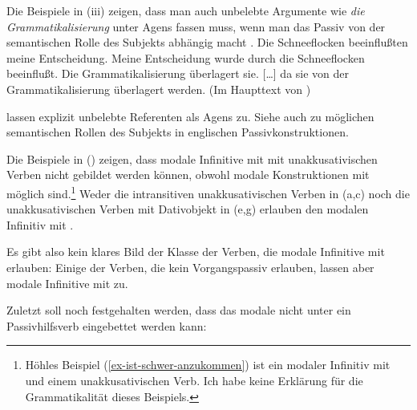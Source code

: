 {        Die Beispiele in (iii) zeigen, dass man auch unbelebte 
        Argumente wie \emph{die Grammatikalisierung} unter Agens fassen muss, wenn
        man das Passiv von der semantischen Rolle des Subjekts abhängig macht \citep[Kapitel~3.1.2]{Mueller2002b}.
        \eal
\ex Die Schneeflocken beeinflußten meine Entscheidung.
\ex Meine Entscheidung wurde durch die Schneeflocken beeinflußt.
\ex Die Grammatikalisierung überlagert sie.
\ex {} [\ldots] da    sie  von der Grammatikalisierung überlagert werden. (Im Haupttext von )
\zl

        \citet[]{HW95a} lassen explizit unbelebte Referenten als Agens zu.
        Siehe auch  zu möglichen semantischen Rollen des Subjekts in
        englischen Passivkonstruktionen.%
}

\noindent
Die Beispiele in () zeigen, dass modale Infinitive mit \sein mit unakkusativischen
Verben nicht gebildet werden können, obwohl modale Konstruktionen mit \haben möglich sind.\footnote{
        Höhles Beispiel (\ref{ex-ist-schwer-anzukommen}) ist ein modaler Infinitiv mit
        \sein und einem unakkusativischen Verb. Ich habe keine Erklärung für die Grammatikalität dieses Beispiels.
}
\eal
{}
\zl
Weder die intransitiven unakkusativischen Verben in (a,c) noch die
unakkusativischen Verben mit Dativobjekt in (e,g) erlauben 
den modalen Infinitiv mit \sein.

Es gibt also kein klares Bild der Klasse der Verben, die modale Infinitive mit \sein erlauben:
Einige der Verben, die kein Vorgangspassiv erlauben, lassen aber modale Infinitive mit \sein
zu.%

Zuletzt soll noch festgehalten werden, dass das modale \sein nicht unter ein Passivhilfsverb
eingebettet werden kann:
\z
%
%


